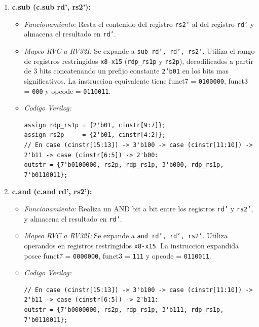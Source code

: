 \documentclass[12pt, a4paper]{article}
\begin{document}
\begin{enumerate}
    \item \textbf{c.sub (c.sub rd', rs2'):}
    \begin{itemize}
        \item \textit{Funcionamiento:} Resta el contenido del registro \texttt{rs2'} al del registro \texttt{rd'} y almacena el resultado en \texttt{rd'}.
        \item \textit{Mapeo RVC a RV32I:} Se expande a \texttt{sub rd', rd', rs2'}. Utiliza el rango de registros restringidos \texttt{x8-x15} (\texttt{rdp\_rs1p} y \texttt{rs2p}), decodificados a partir de 3 bits concatenando un prefijo constante \texttt{2'b01} en los bits mas significativos. La instruccion equivalente tiene funct7 = \texttt{0100000}, funct3 = \texttt{000} y opcode = \texttt{0110011}.
        \item \textit{Codigo Verilog:}
        \begin{lstlisting}[style=verilogstyle]
assign rdp_rs1p = {2'b01, cinstr[9:7]};
assign rs2p     = {2'b01, cinstr[4:2]};
// En case (cinstr[15:13]) -> 3'b100 -> case (cinstr[11:10]) -> 2'b11 -> case (cinstr[6:5]) -> 2'b00:
outstr = {7'b0100000, rs2p, rdp_rs1p, 3'b000, rdp_rs1p, 7'b0110011};
        \end{lstlisting}
    \end{itemize}

    \item \textbf{c.and (c.and rd', rs2'):}
    \begin{itemize}
        \item \textit{Funcionamiento:} Realiza un AND bit a bit entre los registros \texttt{rd'} y \texttt{rs2'}, y almacena el resultado en \texttt{rd'}.
        \item \textit{Mapeo RVC a RV32I:} Se expande a \texttt{and rd', rd', rs2'}. Utiliza operandos en registros restringidos \texttt{x8-x15}. La instruccion expandida posee funct7 = \texttt{0000000}, funct3 = \texttt{111} y opcode = \texttt{0110011}.
        \item \textit{Codigo Verilog:}
        \begin{lstlisting}[style=verilogstyle]
// En case (cinstr[15:13]) -> 3'b100 -> case (cinstr[11:10]) -> 2'b11 -> case (cinstr[6:5]) -> 2'b11:
outstr = {7'b0000000, rs2p, rdp_rs1p, 3'b111, rdp_rs1p, 7'b0110011};
        \end{lstlisting}
    \end{itemize}


\end{enumerate}
\end{document}
